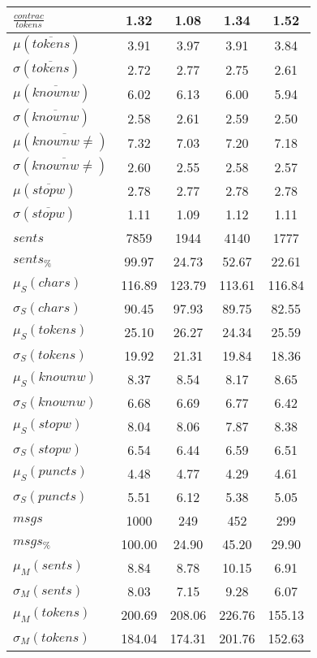 \begin{table}[h!]
\begin{center}
\begin{tabular}{| l || c | c | c | c |}
$\frac{contrac}{tokens}$ & 1.32  & 1.08  & 1.34  & 1.52 \\\hline\hline
$\mu(\overline{tokens})$ & 3.91  & 3.97  & 3.91  & 3.84 \\
$\sigma(\overline{tokens})$ & 2.72  & 2.77  & 2.75  & 2.61 \\\hline
$\mu(\overline{knownw})$ & 6.02  & 6.13  & 6.00  & 5.94 \\
$\sigma(\overline{knownw})$ & 2.58  & 2.61  & 2.59  & 2.50 \\\hline
$\mu(\overline{knownw \neq})$ & 7.32  & 7.03  & 7.20  & 7.18 \\
$\sigma(\overline{knownw \neq})$ & 2.60  & 2.55  & 2.58  & 2.57 \\\hline
$\mu(\overline{stopw})$ & 2.78  & 2.77  & 2.78  & 2.78 \\
$\sigma(\overline{stopw})$ & 1.11  & 1.09  & 1.12  & 1.11 \\\hline\hline
$sents$ & 7859  & 1944  & 4140  & 1777 \\
$sents_{\%}$ & 99.97  & 24.73  & 52.67  & 22.61 \\\hline
$\mu_S(chars)$ & 116.89  & 123.79  & 113.61  & 116.84 \\
$\sigma_S(chars)$ & 90.45  & 97.93  & 89.75  & 82.55 \\\hline
$\mu_S(tokens)$ & 25.10  & 26.27  & 24.34  & 25.59 \\
$\sigma_S(tokens)$ & 19.92  & 21.31  & 19.84  & 18.36 \\\hline
$\mu_S(knownw)$ & 8.37  & 8.54  & 8.17  & 8.65 \\
$\sigma_S(knownw)$ & 6.68  & 6.69  & 6.77  & 6.42 \\\hline
$\mu_S(stopw)$ & 8.04  & 8.06  & 7.87  & 8.38 \\
$\sigma_S(stopw)$ & 6.54  & 6.44  & 6.59  & 6.51 \\\hline
$\mu_S(puncts)$ & 4.48  & 4.77  & 4.29  & 4.61 \\
$\sigma_S(puncts)$ & 5.51  & 6.12  & 5.38  & 5.05 \\\hline\hline
$msgs$ & 1000  & 249  & 452  & 299 \\
$msgs_{\%}$ & 100.00  & 24.90  & 45.20  & 29.90 \\\hline
$\mu_M(sents)$ & 8.84  & 8.78  & 10.15  & 6.91 \\
$\sigma_M(sents)$ & 8.03  & 7.15  & 9.28  & 6.07 \\\hline
$\mu_M(tokens)$ & 200.69  & 208.06  & 226.76  & 155.13 \\
$\sigma_M(tokens)$ & 184.04  & 174.31  & 201.76  & 152.63 \\\hline

\end{tabular}
\end{center}
\end{table}
